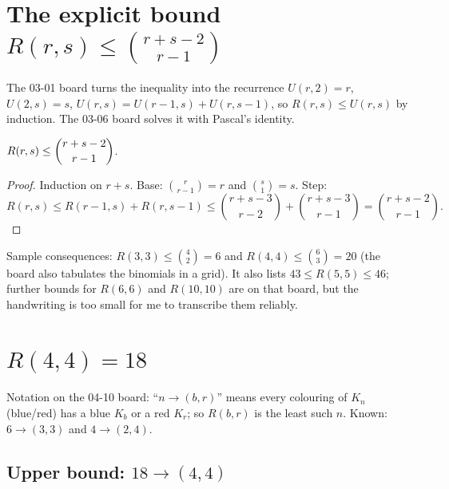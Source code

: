 \documentclass[11pt]{article}
\begin{document}
\section{The explicit bound $R(r,s)\le\binom{r+s-2}{r-1}$}

The 03-01 board turns the inequality into the recurrence $U(r,2)=r$, $U(2,s)=s$, $U(r,s)=U(r-1,s)+U(r,s-1)$, so $R(r,s)\le U(r,s)$ by induction. The 03-06 board solves it with Pascal's identity.

\begin{theorem}
$R(r,s)\le\dbinom{r+s-2}{r-1}$.
\end{theorem}
\begin{proof}
Induction on $r+s$. Base: $\binom{r}{r-1}=r$ and $\binom{s}{1}=s$. Step:
\[
R(r,s)\le R(r-1,s)+R(r,s-1)\le\binom{r+s-3}{r-2}+\binom{r+s-3}{r-1}=\binom{r+s-2}{r-1}.
\]
\end{proof}

Sample consequences: $R(3,3)\le\binom42=6$ and $R(4,4)\le\binom63=20$ (the board also tabulates the binomials in a grid). It also lists $43\le R(5,5)\le46$; further bounds for $R(6,6)$ and $R(10,10)$ are on that board, but the handwriting is too small for me to transcribe them reliably.

\section{$R(4,4)=18$}

Notation on the 04-10 board: ``$n\to(b,r)$'' means every colouring of $K_n$ (blue/red) has a blue $K_b$ or a red $K_r$; so $R(b,r)$ is the least such $n$. Known: $6\to(3,3)$ and $4\to(2,4)$.

\subsection{Upper bound: $18\to(4,4)$}
\end{document}
